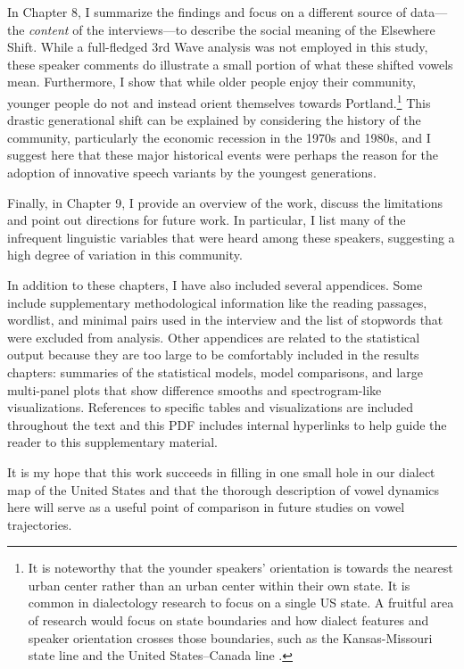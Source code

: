 In Chapter 8, I summarize the findings and focus on a different source of data---the \textit{content} of the interviews---to describe the social meaning of the Elsewhere Shift. While a full-fledged 3rd Wave \citet{eckert_2012} analysis was not employed in this study, these speaker comments do illustrate a small portion of what these shifted vowels mean. Furthermore, I show that while older people enjoy their community, younger people do not and instead orient themselves towards Portland.\footnote{It is noteworthy that the younder speakers' orientation is towards the nearest urban center rather than an urban center within their own state. It is common in dialectology research to focus on a single US state. A fruitful area of research would focus on state boundaries and how dialect features and speaker orientation crosses those boundaries, such as the Kansas-Missouri state line \citet{strelluf_2019} and the United States--Canada line \citet{swan_2016_diss}.} This drastic generational shift can be explained by considering the history of the community, particularly the economic recession in the 1970s and 1980s, and I suggest here that these major historical events were perhaps the reason for the adoption of innovative speech variants by the youngest generations.


Finally, in Chapter 9, I provide an overview of the work, discuss the limitations and point out directions for future work. In particular, I list many of the infrequent linguistic variables that were heard among these speakers, suggesting a high degree of variation in this community.

In addition to these chapters, I have also included several appendices. Some include supplementary methodological information like the reading passages, wordlist, and minimal pairs used in the interview and the list of stopwords that were excluded from analysis. Other appendices are related to the statistical output because they are too large to be comfortably included in the results chapters: summaries of the statistical models, model comparisons, and large multi-panel plots that show difference smooths and spectrogram-like visualizations. References to specific tables and visualizations are included throughout the text and this PDF includes internal hyperlinks to help guide the reader to this supplementary material.

It is my hope that this work succeeds in filling in one small hole in our dialect map of the United States and that the thorough description of vowel dynamics here will serve as a useful point of comparison in future studies on vowel trajectories.
